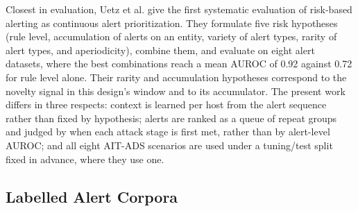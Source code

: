 \documentclass[conference]{IEEEtran}
\begin{document}
Closest in evaluation, Uetz et al. \cite{ref26} give the first systematic evaluation of risk-based alerting as continuous alert prioritization. They formulate five risk hypotheses (rule level, accumulation of alerts on an entity, variety of alert types, rarity of alert types, and aperiodicity), combine them, and evaluate on eight alert datasets, where the best combinations reach a mean AUROC of 0.92 against 0.72 for rule level alone. Their rarity and accumulation hypotheses correspond to the novelty signal in this design's window and to its accumulator. The present work differs in three respects: context is learned per host from the alert sequence rather than fixed by hypothesis; alerts are ranked as a queue of repeat groups and judged by when each attack stage is first met, rather than by alert-level AUROC; and all eight AIT-ADS scenarios are used under a tuning/test split fixed in advance, where they use one.

\subsection{Labelled Alert Corpora}
\end{document}
